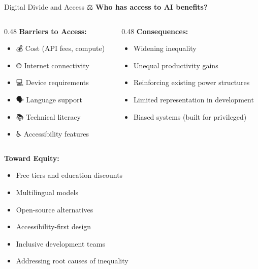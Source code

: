 \documentclass[aspectratio=169]{beamer}
\begin{document}
\begin{frame}[shrink=10]{Digital Divide and Access ⚖️}
\textbf{Who has access to AI benefits?}

\vspace{0.5em}

\begin{columns}[T]
\begin{column}{0.48\textwidth}
\textbf{Barriers to Access:}
\begin{itemize}\setlength{\itemsep}{0pt}
    \item 💰 Cost (API fees, compute)
    \item 🌐 Internet connectivity
    \item 💻 Device requirements
    \item 🗣️ Language support
    \item 📚 Technical literacy
    \item ♿ Accessibility features
\end{itemize}
\end{column}

\begin{column}{0.48\textwidth}
\textbf{Consequences:}
\begin{itemize}\setlength{\itemsep}{0pt}
    \item Widening inequality
    \item Unequal productivity gains
    \item Reinforcing existing power structures
    \item Limited representation in development
    \item Biased systems (built for privileged)
\end{itemize}
\end{column}
\end{columns}

\vspace{0.5em}

\textbf{Toward Equity:}
\begin{itemize}\setlength{\itemsep}{0pt}
    \item Free tiers and education discounts
    \item Multilingual models
    \item Open-source alternatives
    \item Accessibility-first design
    \item Inclusive development teams
    \item Addressing root causes of inequality
\end{itemize}
\end{frame}
\end{document}
